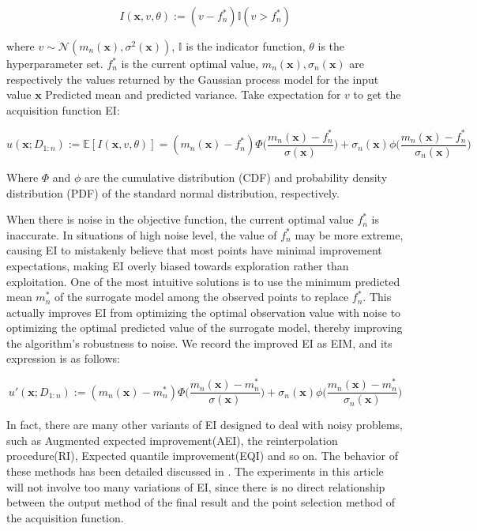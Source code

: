 \documentclass{article}
\begin{document}
\begin{equation}\label{eq6}
	\textit{I}(\textbf{x},v,\theta):=(v-f^*_n)\mathbb{I}(v>f^*_n)
\end{equation}

where $v\sim \mathcal{N}(m_n(\textbf{x}),\sigma^2(\textbf{x}))$, $\mathbb{I}$ is the indicator function, $\theta$ is the hyperparameter set.
$f^*_n$ is the current optimal value, $m_n(\textbf{x}),\sigma_n(\textbf{x})$ are respectively the values returned by the Gaussian process model for the input value $\textbf{x}$ Predicted mean and predicted variance.
Take expectation for $v$ to get the acquisition function EI:

\begin{equation}\label{eq7}
	u(\textbf{x};D_{1:n}):=\mathbb{E}[\textit{I}(\textbf{x},v,\theta)]=(m_n(\textbf{x})-f^*_n)\Phi \Big(\frac{m_n(\textbf{x})-f^*_n}{\sigma(\textbf{x})}\Big)+\sigma_n(\textbf{x})\phi \Big(\frac{m_n(\textbf{x})-f^*_n}{\sigma_n(\textbf{x})} \Big)
\end{equation}

Where $\Phi$ and $\phi$ are the cumulative distribution (CDF) and probability density distribution (PDF) of the standard normal distribution, respectively.

\hspace{2em}When there is noise in the objective function, the current optimal value $f^*_n$ is inaccurate. In situations of high noise level, the value of $f^*_n$ may be more extreme, causing EI to mistakenly believe that
most points have minimal improvement expectations, making EI overly biased towards exploration rather than exploitation. One of the most intuitive solutions is to use the minimum predicted mean $m^*_n$ of the surrogate model among the observed points to replace $f^*_n$. This actually improves EI from optimizing the optimal observation value with noise to optimizing the optimal predicted value of the surrogate model, thereby improving the algorithm's robustness to noise. We record the improved EI as EIM, and its expression is as follows:

\begin{equation}\label{eq8}
	u'(\textbf{x};D_{1:n}):=(m_n(\textbf{x})-m^*_n)\Phi \Big(\frac{m_n(\textbf{x})-m^*_n}{\sigma(\textbf{x})}\Big)+\sigma_n(\textbf{x})\phi \Big(\frac{m_n(\textbf{x})-m^*_n}{\sigma_n(\textbf{x})} \Big)
\end{equation}

\hspace{2em}In fact, there are many other variants of EI designed to deal with noisy problems, such as Augmented expected improvement(AEI)\citep{Huang2006Global}, the reinterpolation procedure(RI)\citep{Forrester2006Design}, Expected quantile improvement(EQI)\citep{Picheny2012Quantile} and so on. The behavior of these methods has been detailed discussed in \citep{Picheny2013benchmark}. The experiments in this article will not involve too many variations of EI, since there is no direct relationship between the output method of the final result and the point selection method of the acquisition function.
\end{document}
